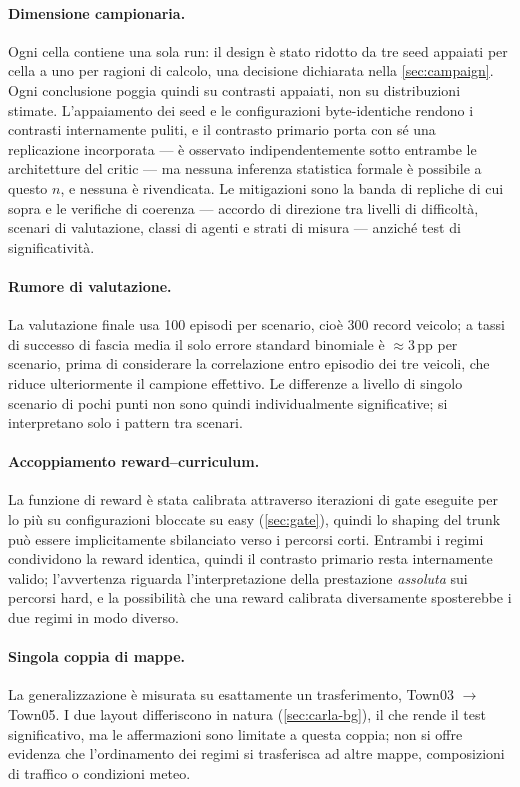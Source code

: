 \paragraph{Dimensione campionaria.}
Ogni cella contiene una sola run: il design è stato ridotto da tre seed
appaiati per cella a uno per ragioni di calcolo, una decisione
dichiarata nella \cref{sec:campaign}. Ogni conclusione poggia quindi su
contrasti appaiati, non su distribuzioni stimate. L'appaiamento dei
seed e le configurazioni byte-identiche rendono i contrasti
internamente puliti, e il contrasto primario porta con sé una
replicazione incorporata --- è osservato indipendentemente sotto
entrambe le architetture del critic --- ma nessuna inferenza statistica
formale è possibile a questo $n$, e nessuna è rivendicata. Le
mitigazioni sono la banda di repliche di cui sopra e le verifiche di
coerenza --- accordo di direzione tra livelli di difficoltà, scenari di
valutazione, classi di agenti e strati di misura --- anziché test di
significatività.

\paragraph{Rumore di valutazione.}
La valutazione finale usa 100 episodi per scenario, cioè 300 record
veicolo; a tassi di successo di fascia media il solo errore standard
binomiale è $\approx$3\,pp per scenario, prima di considerare la
correlazione entro episodio dei tre veicoli, che riduce ulteriormente
il campione effettivo. Le differenze a livello di singolo scenario di
pochi punti non sono quindi individualmente significative; si
interpretano solo i pattern tra scenari.

\paragraph{Accoppiamento reward--curriculum.}
La funzione di reward è stata calibrata attraverso iterazioni di gate
eseguite per lo più su configurazioni bloccate su easy
(\cref{sec:gate}), quindi lo shaping del trunk può essere implicitamente
sbilanciato verso i percorsi corti. Entrambi i regimi condividono la
reward identica, quindi il contrasto primario resta internamente
valido; l'avvertenza riguarda l'interpretazione della prestazione
\emph{assoluta} sui percorsi hard, e la possibilità che una reward
calibrata diversamente sposterebbe i due regimi in modo diverso.

\paragraph{Singola coppia di mappe.}
La generalizzazione è misurata su esattamente un trasferimento, Town03
$\to$ Town05. I due layout differiscono in natura
(\cref{sec:carla-bg}), il che rende il test significativo, ma le
affermazioni sono limitate a questa coppia; non si offre evidenza che
l'ordinamento dei regimi si trasferisca ad altre mappe, composizioni di
traffico o condizioni meteo.

